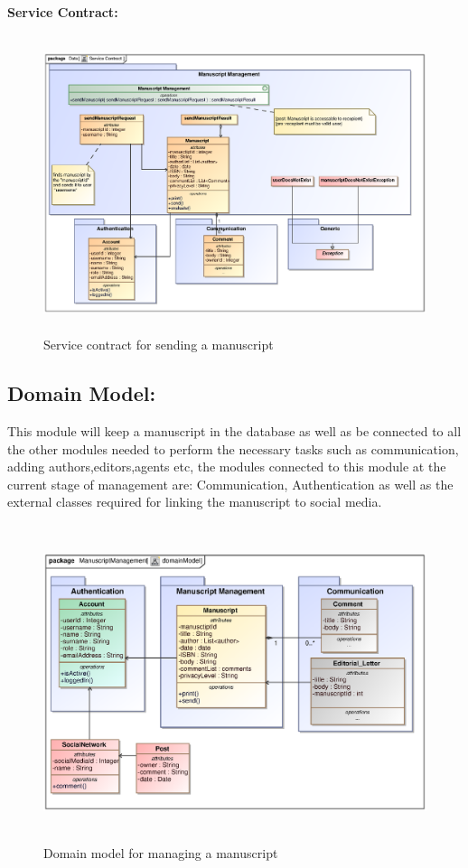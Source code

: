 \begin{enumerate}
\textbf{Service Contract:}

\begin{figure}[h]
\includegraphics[height=330px, width=500px]{epsImages/ManuscriptManagement/sendManuscriptServiceContract.eps}
\caption{Service contract for sending a manuscript}
\end{figure}
 \newpage
\subsection{Domain Model:} 
\par {This module will keep a manuscript in the database as well as be connected to all the other modules needed to perform the necessary tasks such as communication, adding authors,editors,agents etc, the modules connected to this module at the current stage of management are: Communication, Authentication as well as the external classes required for linking the manuscript to social media.}

 \begin{figure}[h]
\includegraphics[height=350px, width=500px]{epsImages/DomainModels/ManuscriptManagement.eps}
\caption{Domain model for managing a manuscript}
\end{figure}

\end{enumerate}

